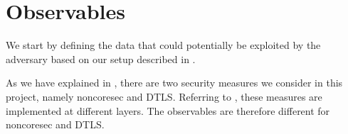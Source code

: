 %
%
%
%
%
%
%
%
%
%

\section{Observables}

We start by defining the data that could potentially be exploited by the adversary based on our setup described in .

As we have explained in , there are two security measures we consider in this project, namely noncoresec and DTLS. Referring to , these measures are implemented at different layers. The observables are therefore different for noncoresec and DTLS. 

